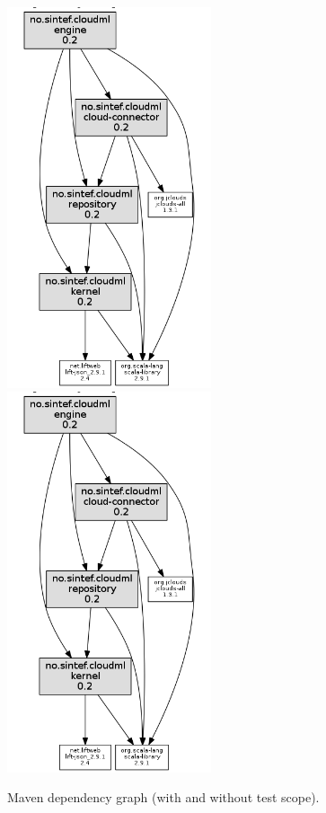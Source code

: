 \begin{figure}[tb]
  \includegraphics[width=6cm]{img/dependency-graph.png}
  \includegraphics[width=6cm]{img/dependency-graph.png}
  \caption{Maven dependency graph (with and without test scope).}
  \label{fig:dependendy-graph}
\end{figure}
